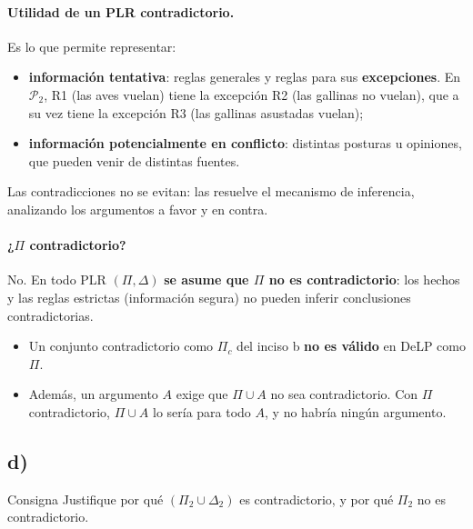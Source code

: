 \documentclass[11pt,a4paper]{article}
\begin{document}
\paragraph{Utilidad de un PLR contradictorio.} Es lo que permite representar:
\begin{itemize}
  \item \textbf{información tentativa}: reglas generales y reglas para sus \textbf{excepciones}. En $\mathcal{P}_2$, R1 (las aves vuelan) tiene la excepción R2 (las gallinas no vuelan), que a su vez tiene la excepción R3 (las gallinas asustadas vuelan);
  \item \textbf{información potencialmente en conflicto}: distintas posturas u opiniones, que pueden venir de distintas fuentes.
\end{itemize}
Las contradicciones no se evitan: las resuelve el mecanismo de inferencia, analizando los argumentos a favor y en contra.

\paragraph{¿$\Pi$ contradictorio?} No. En todo PLR $(\Pi, \Delta)$ \textbf{se asume que $\Pi$ no es contradictorio}: los hechos y las reglas estrictas (información segura) no pueden inferir conclusiones contradictorias.
\begin{itemize}
  \item Un conjunto contradictorio como $\Pi_c$ del inciso b \textbf{no es válido} en DeLP como $\Pi$.
  \item Además, un argumento $A$ exige que $\Pi \cup A$ no sea contradictorio. Con $\Pi$ contradictorio, $\Pi \cup A$ lo sería para todo $A$, y no habría ningún argumento.
\end{itemize}

\subsection{d)}

\begin{enunciado}{Consigna}
Justifique por qué $(\Pi_2 \cup \Delta_2)$ es contradictorio, y por qué $\Pi_2$ no es contradictorio.
\end{enunciado}
\end{document}
